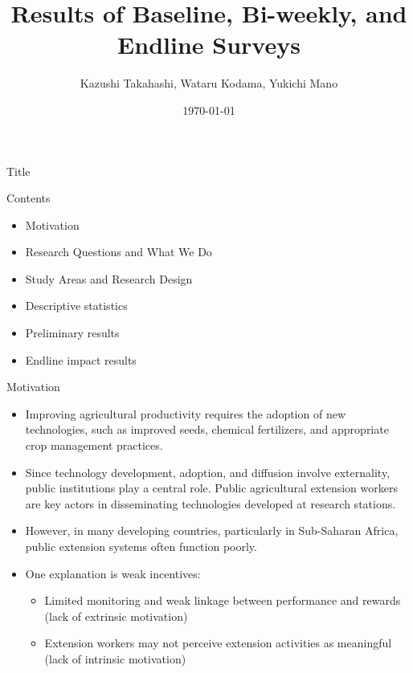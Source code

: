 \documentclass[aspectratio=169]{beamer}
\title[Short Title]{Results of Baseline, Bi-weekly, and Endline Surveys}
\author[Takahashi et al.]{Kazushi Takahashi, Wataru Kodama, Yukichi Mano}
\date{\today}
\begin{document}
	
	\begin{frame}{Title}
		\titlepage
	\end{frame}
	
	\begin{frame}{Contents} %
		\begin{itemize}
			\item Motivation %
			\item Research Questions and What We Do
			\item Study Areas and Research Design
			\item Descriptive statistics
			\item Preliminary results
			\item Endline impact results
		\end{itemize}
	\end{frame}
\begin{frame}{Motivation}
	
	\begin{itemize}
		\item Improving agricultural productivity requires the adoption of new technologies,
		such as improved seeds, chemical fertilizers, and appropriate crop management practices.
		
		\vspace{0.3cm}
		
		\item Since technology development, adoption, and diffusion involve externality,
		public institutions play a central role.
		Public agricultural extension workers are key actors in disseminating technologies
		developed at research stations.
		
		\vspace{0.3cm}
		
		\item However, in many developing countries, particularly in Sub-Saharan Africa,
		public extension systems often function poorly.
		
		\vspace{0.3cm}
		
		\item One explanation is weak incentives:
		\begin{itemize}
			\item Limited monitoring and weak linkage between performance and rewards
			(lack of extrinsic motivation)
			\item Extension workers may not perceive extension activities as meaningful
			(lack of intrinsic motivation)
		\end{itemize}
		
		\vspace{0.3cm}
		
		
	\end{itemize}
	
\end{frame}
\end{document}
